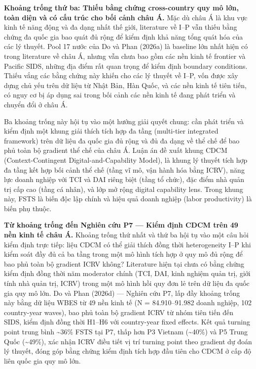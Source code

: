 \documentclass[12pt,a4paper]{article}
\begin{document}
\textbf{Khoảng trống thứ ba: Thiếu bằng chứng cross-country quy mô lớn,
toàn diện và có cấu trúc cho bối cảnh châu Á.} Mặc dù châu Á là khu vực
kinh tế năng động và đa dạng nhất thế giới, literature về I--P vẫn thiếu
bằng chứng đa quốc gia bao quát đủ rộng để kiểm định khả năng tổng quát
hóa của các lý thuyết. Pool 17 nước của Do và Phan (2026a) là baseline
lớn nhất hiện có trong literature về châu Á, nhưng vẫn chưa bao gồm các
nền kinh tế frontier và Pacific SIDS, những địa điểm rất quan trọng để
kiểm định boundary conditions. Thiếu vắng các bằng chứng này khiến cho
các lý thuyết về I--P, vốn được xây dựng chủ yếu trên dữ liệu từ Nhật
Bản, Hàn Quốc, và các nền kinh tế tiên tiến, có nguy cơ bị áp dụng sai
trong bối cảnh các nền kinh tế đang phát triển và chuyển đổi ở châu Á.

Ba khoảng trống này hội tụ vào một hướng giải quyết chung: cần phát
triển và kiểm định một khung giải thích tích hợp đa tầng (multi-tier
integrated framework) trên dữ liệu đa quốc gia đủ rộng và đủ đa dạng về
thể chế để bao phủ toàn bộ gradient thể chế của châu Á. Luận án đề xuất
khung CDCM (Context-Contingent Digital-and-Capability Model), là khung
lý thuyết tích hợp đa tầng kết hợp bối cảnh thể chế (tầng vĩ mô, vận
hành hóa bằng ICRV), năng lực doanh nghiệp với TCI và DAI riêng biệt
(tầng tổ chức), đặc điểm nhà quản trị cấp cao (tầng cá nhân), và lớp mở
rộng digital capability lens. Trong khung này, FSTS là biến độc lập
chính và hiệu quả doanh nghiệp (labor productivity) là biến phụ thuộc.

\textbf{Từ khoảng trống đến Nghiên cứu P7 --- Kiểm định CDCM trên 49 nền
kinh tế châu Á.} Khoảng trống thứ nhất và thứ ba hội tụ vào một câu hỏi
kiểm định trực tiếp: liệu CDCM có thể giải thích đồng thời heterogeneity
I--P khi kiểm soát đầy đủ cả ba tầng trong một mô hình tích hợp ở quy mô
đủ rộng để bao phủ toàn bộ gradient ICRV không? Literature hiện tại chưa
có bằng chứng kiểm định đồng thời năm moderator chính (TCI, DAI, kinh
nghiệm quản trị, giới tính nhà quản trị, ICRV) trong một mô hình hồi quy
đơn lẻ trên dữ liệu đa quốc gia quy mô lớn. Do và Phan (2026d) ---
Nghiên cứu P7, lấp đầy khoảng trống này bằng dữ liệu WBES từ 49 nền kinh
tế (N = 84.910--91.982 doanh nghiệp, 102 country-year waves), bao phủ
toàn bộ gradient ICRV từ nhóm tiên tiến đến SIDS, kiểm định đồng thời
H1--H6 với country-year fixed effects. Kết quả turning point trung bình
\textasciitilde36\% FSTS tại P7, thấp hơn P3 Vietnam
(\textasciitilde40\%) và P5 Trung Quốc (\textasciitilde49\%), xác nhận
ICRV điều tiết vị trí turning point theo gradient dự đoán lý thuyết,
đóng góp bằng chứng kiểm định tích hợp đầu tiên cho CDCM ở cấp độ liên
quốc gia quy mô lớn.
\end{document}
